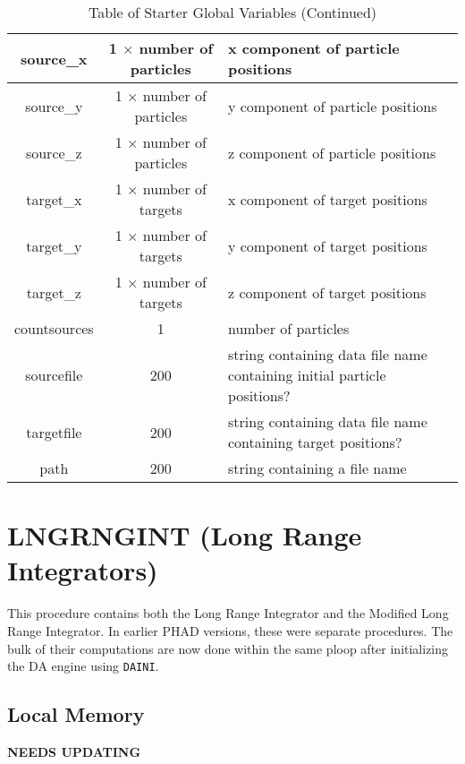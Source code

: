 \documentclass[oneside,12pt]{book}
\begin{document}
\begin{center}
\begin{table}[ht]
\begin{tabular}{|c|c|p{2.7in}|}
\hline
source\_x & 1 $\times$ number of particles & x component of particle positions\\
\hline
source\_y & 1 $\times$ number of particles & y component of particle positions\\
\hline
source\_z & 1 $\times$ number of particles & z component of particle positions\\
\hline
target\_x & 1 $\times$ number of targets & x component of target positions\\
\hline
target\_y & 1 $\times$ number of targets & y component of target positions\\
\hline
target\_z & 1 $\times$ number of targets & z component of target positions\\
\hline
countsources & 1 & number of particles\\
\hline
sourcefile & 200 & string containing data file name containing initial particle positions?\\
\hline
targetfile & 200 & string containing data file name containing target positions?\\
\hline
path & 200 & string containing a file name\\
\hline
\end{tabular}
\caption{Table of Starter Global Variables (Continued)}
\end{table}
\end{center}

\clearpage


\section{LNGRNGINT (Long Range Integrators)}

This procedure contains both the Long Range Integrator and the Modified Long Range Integrator.  In earlier PHAD versions, these were separate procedures.  The bulk of their computations are now done within the same ploop after initializing the DA engine using \texttt{DAINI}.

\subsection{Local Memory}

{\bf\color{red} NEEDS UPDATING}
\end{document}
